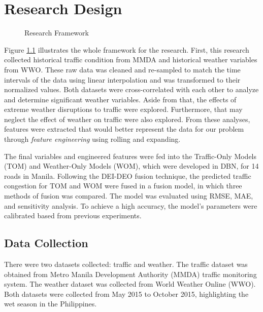 \chapter{Research Design}
\label{resdes}
\begin{comment}

\end{comment}

\begin{figure}[h]
	\centering
	\captionsetup{justification=centering}
	\caption{Research Framework}
	\label{fig:framework}
\end{figure}



Figure \ref{fig:framework} illustrates the whole framework for the research. First, this research collected historical traffic condition from MMDA and historical weather variables from WWO. These raw data was cleaned and re-sampled to match the time intervals of the data using linear interpolation and was transformed to their normalized values. Both datasets were cross-correlated with each other to analyze and determine significant weather variables. Aside from that, the effects of extreme weather disruptions to traffic were explored. Furthermore, that may neglect the effect of weather on traffic were also explored. From these analyses, features were extracted that would better represent the data for our problem through \textit{feature engineering} using rolling and expanding. 

The final variables and engineered features were fed into the Traffic-Only Models (TOM) and Weather-Only Models (WOM), which were developed in DBN, for 14 roads in Manila. Following the DEI-DEO fusion technique, the predicted traffic congestion for TOM and WOM were fused in a fusion model, in which three methods of fusion was compared. The model was evaluated using RMSE, MAE, and sensitivity analysis. To achieve a high accuracy, the model's parameters were calibrated based from previous experiments. 


\section{Data Collection} \label{rd_datacollection}
There were two datasets collected: traffic and weather. The traffic dataset was obtained from Metro Manila Development Authority (MMDA) traffic monitoring system. The weather dataset was collected from World Weather Online (WWO). Both datasets were collected from May 2015 to October 2015, highlighting the wet season in the Philippines.

